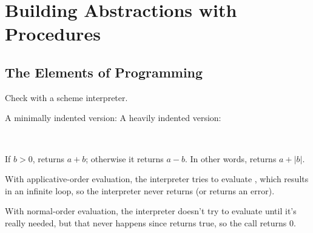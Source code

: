 \chapter{Building Abstractions with Procedures}

\section{The Elements of Programming}

\begin{exe}
    Check with a scheme interpreter.
\end{exe}

\begin{exe}
    A minimally indented version:
    A heavily indented version:
\end{exe}

\begin{exe}
    \ \vspace{-20pt}
\end{exe}

\begin{exe}
  If $b > 0$,  returns $a + b$; otherwise it returns $a 
- b$.
In other words,  returns $a + |b|$.
\end{exe}

\begin{exe}
    With applicative-order evaluation, the interpreter tries to evaluate 
    , which results in an infinite loop, so the interpreter never 
    returns (or returns an error).

    With normal-order evaluation, the interpreter doesn't try to evaluate 
     until it's really needed, but that never happens since
     returns true, so the call returns 0.
\end{exe}


